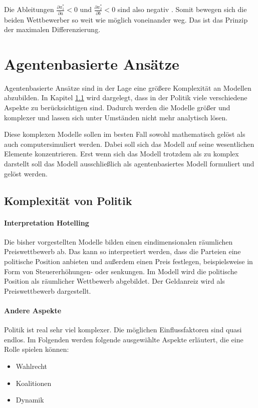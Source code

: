 Die Ableitungen $\frac{\partial \pi_1^*}{\partial a}<0$ und $\frac{\partial \pi_2^*}{\partial b}<0$ sind also negativ \citep[S.\,1149]{aspremont1979}.
Somit bewegen sich die beiden Wettbewerber so weit wie möglich voneinander weg. Das ist das Prinzip der maximalen Differenzierung.

\section{Agentenbasierte Ansätze}\label{Sec-ABM}

Agentenbasierte Ansätze sind in der Lage eine größere Komplexität an Modellen abzubilden.
In Kapitel \ref{sec:ABM-Komplexität} wird dargelegt, dass in der Politik viele verschiedene Aspekte zu berücksichtigen sind.
Dadurch werden die Modelle größer und komplexer und lassen sich unter Umständen nicht mehr analytisch lösen.

Diese komplexen Modelle sollen im besten Fall sowohl mathematisch gelöst als auch computersimuliert werden. Dabei soll sich das Modell auf seine wesentlichen Elemente konzentrieren. Erst wenn sich das Modell trotzdem als zu komplex darstellt soll das Modell ausschließlich als agentenbasiertes Modell formuliert und gelöst werden. \citep[S.\,13]{marchi2014ABMs}

\subsection{Komplexität von Politik} \label{sec:ABM-Komplexität}
\paragraph{Interpretation Hotelling}
Die bisher vorgestellten Modelle bilden einen eindimensionalen räumlichen Preiswettbewerb ab.
Das kann so interpretiert werden, dass die Parteien eine politische Position anbieten und außerdem einen Preis festlegen, beispielsweise in Form von Steuererhöhungen- oder senkungen.
Im Modell wird die politische Position als räumlicher Wettbewerb abgebildet.
Der Geldanreiz wird als Preiswettbewerb dargestellt.

\paragraph{Andere Aspekte}
Politik ist real sehr viel komplexer.
Die möglichen Einflussfaktoren sind quasi endlos.
Im Folgenden werden folgende ausgewählte Aspekte erläutert, die eine Rolle spielen können:
\begin{itemize}
	\item Wahlrecht
	\item Koalitionen
	\item Dynamik
\end{itemize}


